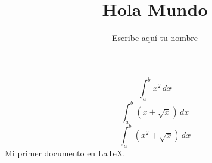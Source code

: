 \documentclass{article}
\title{Hola Mundo}
\author{Escribe aqu\'i tu nombre}
\begin{document}

\maketitle
\[\int_{a}^{b} x^2 \,dx\]
\[\int_{a}^{b} (x+ \sqrt{x}) \,dx\]
\[\int_{a}^{b} (x^2 + \sqrt{x}) \,dx\]
Mi primer documento en \LaTeX{}.
\end{document}
